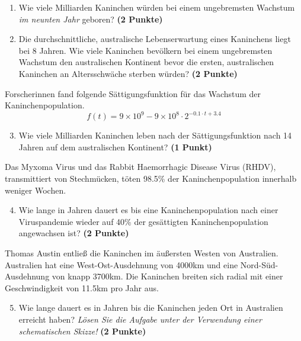 \documentclass[a4paper, 10pt]{scrartcl}\usepackage[]{graphicx}\usepackage[]{xcolor}
\begin{document}
\begin{enumerate}
\item Wie viele Milliarden Kaninchen w{\"u}rden bei einem ungebremsten
  Wachstum \textit{im neunten Jahr} geboren? \textbf{(2 Punkte)}
\item Die durchschnittliche, australische Lebenserwartung eines Kaninchens
  liegt bei 8 Jahren. Wie viele Kaninchen bev{\"o}lkern bei einem
  ungebremsten Wachstum den australischen Kontinent bevor die ersten,
  australischen Kaninchen an Altersschw{\"a}che sterben w{\"u}rden? \textbf{(2
    Punkte)}
\end{enumerate}

Forscherinnen fand folgende S{\"a}ttigungsfunktion f{\"u}r das Wachstum der
Kaninchenpopulation.
\begin{equation*}
  f(t) = \ensuremath{9\times 10^{9}} - \ensuremath{9\times 10^{8}} \cdot 2^{-0.1 \cdot t + 3.4}
\end{equation*}

\begin{enumerate}
  \setcounter{enumi}{2}
\item Wie viele Milliarden Kaninchen leben nach der S{\"a}ttigungsfunktion
  nach 14 Jahren auf dem australischen Kontinent? \textbf{(1
    Punkt)}
\end{enumerate}

Das Myxoma Virus und das Rabbit Haemorrhagic Disease Virus (RHDV),
transmittiert von Stechm{\"u}cken, t{\"o}ten 98.5\% der
Kaninchenpopulation innerhalb weniger Wochen. 

\begin{enumerate}
  \setcounter{enumi}{3}  
\item Wie lange in Jahren dauert es bis eine Kaninchenpopulation nach einer
  Viruspandemie wieder auf 40\% der ges{\"a}ttigten
  Kaninchenpopulation angewachsen ist?  \textbf{(2 Punkte)}
\end{enumerate}

Thomas Austin entlie{\ss} die Kaninchen im {\"a}u{\ss}ersten Westen von
Australien. Australien hat eine West-Ost-Ausdehnung von 4000km
und eine Nord-S{\"u}d-Ausdehnung von knapp 3700km. Die Kaninchen
breiten sich radial mit einer Geschwindigkeit von 11.5km pro
Jahr aus.

\begin{enumerate}
  \setcounter{enumi}{4}
\item Wie lange dauert es in Jahren bis die Kaninchen jeden Ort
  in Australien erreicht haben? \textit{L{\"o}sen Sie die Aufgabe unter der
    Verwendung einer schematischen Skizze!} \textbf{(2 Punkte)}
\end{enumerate}
\end{document}
